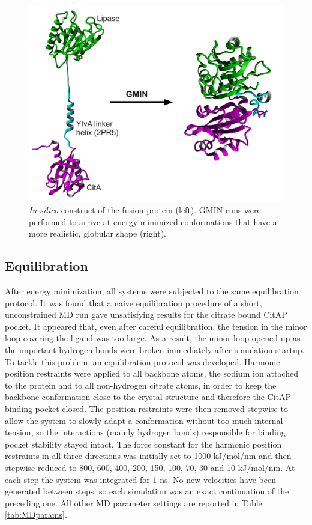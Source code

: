 \documentclass[english, a4paper, 12pt, titlepage, draft]{article}
\begin{document}
\begin{figure}
    \centering
    \includegraphics[width=1.0\textwidth]{figures/Complex_folding/complex_folding.pdf}
    \caption{\emph{In silico} construct of the fusion protein (left). GMIN runs were performed to arrive at energy minimized conformations that have a more realistic, globular shape (right).}
    \label{fig:ComplexConstruct}
\end{figure}      
 


\subsection{Equilibration}
\label{sec:eq}

After energy minimization, all systems were subjected to the same equilibration protocol.
It was found that a naive equilibration procedure of a short, unconstrained MD run gave unsatisfying results for the citrate bound CitAP pocket.
It appeared that, even after careful equilibration, the tension in the minor loop covering the ligand was too large.
As a result, the minor loop opened up as the important hydrogen bonds were broken immediately after simulation startup.
To tackle this problem, an equilibration protocol was developed.
Harmonic position restraints were applied to all backbone atoms, the sodium ion attached to the protein and to all non-hydrogen citrate atoms, in order to keep the backbone conformation close to the crystal structure and therefore the CitAP binding pocket closed.
The position restraints were then removed stepwise to allow the system to slowly adapt a conformation without too much internal tension, so the interactions (mainly hydrogen bonds) responsible for binding pocket stability stayed intact.
The force constant for the harmonic position restraints in all three directions was initially set to 1000 kJ/mol/nm and then stepwise reduced to 800, 600, 400, 200, 150, 100, 70, 30 and 10 kJ/mol/nm.
At each step the system was integrated for 1 ns.
No new velocities have been generated between steps, so each simulation was an exact continuation of the preceding one.
All other MD parameter settings are reported in Table \ref{tab:MDparams}.
\end{document}
